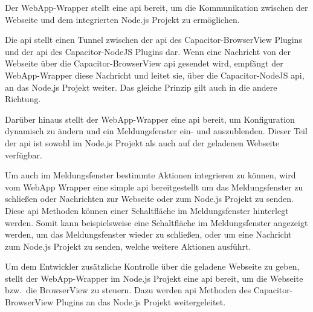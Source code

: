 Der WebApp-Wrapper stellt eine \ac{api} bereit, um die Kommunikation zwischen der Webseite und dem integrierten Node.js Projekt zu ermöglichen.

Die \ac{api} stellt einen Tunnel zwischen der \ac{api} des Capacitor-BrowserView Plugins und der \ac{api} des Capacitor-NodeJS Plugins dar.
Wenn eine Nachricht von der Webseite über die Capacitor-BrowserView \ac{api} gesendet wird, empfängt der WebApp-Wrapper diese Nachricht und leitet sie, über die Capacitor-NodeJS \ac{api}, an das Node.js Projekt weiter.
Das gleiche Prinzip gilt auch in die andere Richtung.

Darüber hinaus stellt der WebApp-Wrapper eine \ac{api} bereit, um Konfiguration dynamisch zu ändern und ein Meldungsfenster ein- und auszublenden.
Dieser Teil der \ac{api} ist sowohl im Node.js Projekt als auch auf der geladenen Webseite verfügbar.

Um auch im Meldungsfenster bestimmte Aktionen integrieren zu können, wird vom WebApp Wrapper eine simple \ac{api} bereitgestellt um das Meldungsfenster zu schließen oder Nachrichten zur Webseite oder zum Node.js Projekt zu senden.
Diese \ac{api} Methoden können einer Schaltfläche im Meldungsfenster hinterlegt werden.
Somit kann beispielsweise eine Schaltfläche im Meldungsfenster angezeigt werden, um das Meldungsfenster wieder zu schließen, oder um eine Nachricht zum Node.js Projekt zu senden, welche weitere Aktionen ausführt.

Um dem Entwickler zusätzliche Kontrolle über die geladene Webseite zu geben, stellt der WebApp-Wrapper im Node.js Projekt eine \ac{api} bereit, um die Webseite bzw.\ die BrowserView zu steuern.
Dazu werden \ac{api} Methoden des Capacitor-BrowserView Plugins an das Node.js Projekt weitergeleitet.
